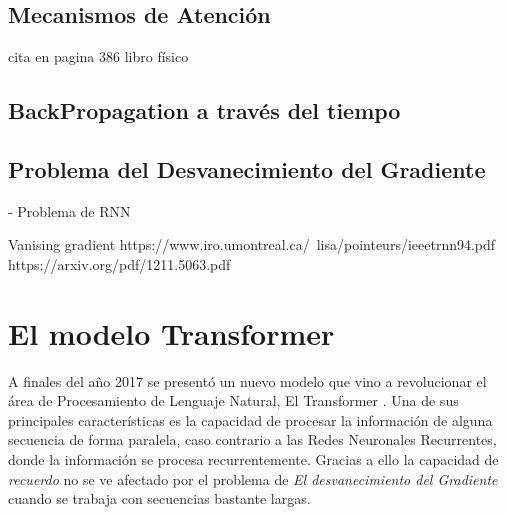 



\subsection{Mecanismos de Atención}
cita en pagina 386 libro físico

\subsection{BackPropagation a través del tiempo}

\subsection{Problema del Desvanecimiento del Gradiente}

- Problema de RNN

Vanising gradient
https://www.iro.umontreal.ca/~lisa/pointeurs/ieeetrnn94.pdf
https://arxiv.org/pdf/1211.5063.pdf


\section{El modelo Transformer}

A finales del año 2017 se presentó un nuevo modelo que vino a revolucionar el área de Procesamiento
de Lenguaje Natural, El Transformer \cite{Vaswani}. Una de sus principales características es la
capacidad de procesar la información de alguna secuencia de forma paralela, caso contrario a las
Redes Neuronales Recurrentes, donde la información se procesa recurrentemente. Gracias a ello
la capacidad de \textit{recuerdo} no se ve afectado por el problema de \textit{El
desvanecimiento del Gradiente} cuando se trabaja con secuencias bastante largas.

\begin{figure}
    \begin{center}
        \scalebox{0.4}{}
    \end{center}
\end{figure}
